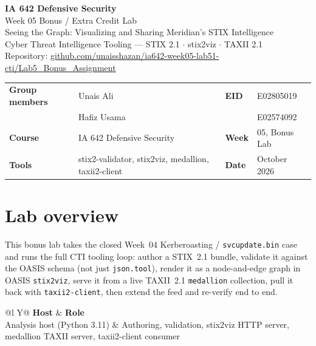 \documentclass[11pt,letterpaper]{article}
\begin{document}
\begin{center}
{\LARGE\bfseries IA 642 Defensive Security}\\[0.25em]
{\Large Week 05 Bonus / Extra Credit Lab}\\[0.2em]
{\large Seeing the Graph: Visualizing and Sharing Meridian's STIX Intelligence}\\[0.35em]
{\small Cyber Threat Intelligence Tooling --- STIX 2.1 $\cdot$ stix2viz $\cdot$ TAXII 2.1}\\[0.25em]
{\small Repository:
\href{https://github.com/unaisshazan/ia642-week05-lab51-cti/tree/master/Lab5_Bonus_Assignment}{github.com/unaisshazan/ia642-week05-lab51-cti/Lab5\_Bonus\_Assignment}}\\[0.25em]
\end{center}

\begin{tabularx}{\textwidth}{@{}l X l l@{}}
\toprule
\textbf{Group members} & Unais Ali & \textbf{EID} & E02805019 \\
 & Hafiz Usama &  & E02574092 \\
\textbf{Course} & IA 642 Defensive Security & \textbf{Week} & 05, Bonus Lab \\
\textbf{Tools} & stix2-validator, stix2viz, medallion, taxii2-client & \textbf{Date} & October 2026 \\
\bottomrule
\end{tabularx}

\vspace{0.55em}

\section*{Lab overview}

This bonus lab takes the closed Week~04 Kerberoasting / \texttt{svcupdate.bin} case and runs the full CTI tooling loop: author a STIX~2.1 bundle, validate it against the OASIS schema (not just \texttt{json.tool}), render it as a node-and-edge graph in OASIS \texttt{stix2viz}, serve it from a live TAXII~2.1 \texttt{medallion} collection, pull it back with \texttt{taxii2-client}, then extend the feed and re-verify end to end.

\begin{tabularx}{\textwidth}{@{}l Y@{}}
\toprule
\textbf{Host} & \textbf{Role} \\
\midrule
Analysis host (Python 3.11) & Authoring, validation, stix2viz HTTP server, medallion TAXII server, taxii2-client consumer \\
\bottomrule
\end{tabularx}
\end{document}

